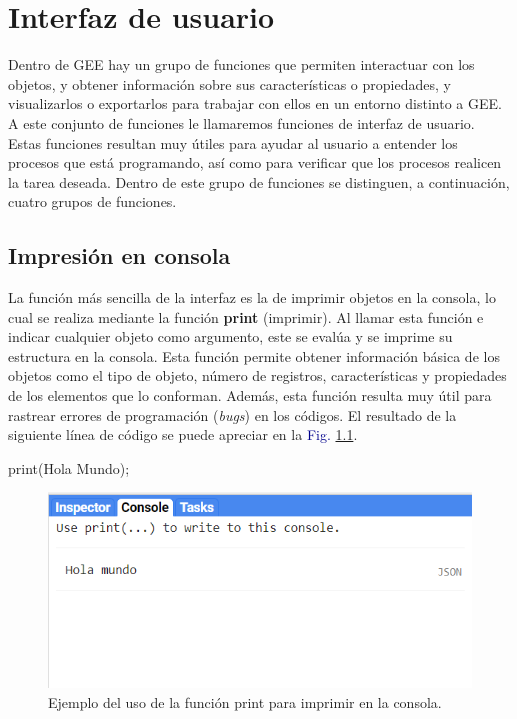 \documentclass[
  12pt,
  letterpaper,
  twoside]{book}
\newenvironment{Shaded}{\begin{snugshade}}{\end{snugshade}}
\newcommand{\FunctionTok}[1]{\textcolor[rgb]{0.48,0.12,0.64}{#1}}
\newcommand{\NormalTok}[1]{#1}
\newcommand{\OperatorTok}[1]{\textcolor[rgb]{0.00,0.00,0.00}{#1}}
\newcommand{\StringTok}[1]{\textcolor[rgb]{0.87,0.29,0.22}{#1}}
\newcommand\boldpurple[1]{\textcolor{darkpurple}{\textbf{#1}}}
\begin{document}
\newpage

\hypertarget{interfaz-de-usuario}{%
\chapter{Interfaz de usuario}\label{interfaz-de-usuario}}

Dentro de GEE hay un grupo de funciones que permiten interactuar con los objetos, y obtener información sobre sus características o propiedades, y visualizarlos o exportarlos para trabajar con ellos en un entorno distinto a GEE. A este conjunto de funciones le llamaremos funciones de interfaz de usuario. Estas funciones resultan muy útiles para ayudar al usuario a entender los procesos que está programando, así como para verificar que los procesos realicen la tarea deseada. Dentro de este grupo de funciones se distinguen, a continuación, cuatro grupos de funciones.

\hypertarget{impresiuxf3n-en-consola}{%
\section{Impresión en consola}\label{impresiuxf3n-en-consola}}

La función más sencilla de la interfaz es la de imprimir objetos en la consola, lo cual se realiza mediante la función \boldpurple{print} (imprimir). Al llamar esta función e indicar cualquier objeto como argumento, este se evalúa y se imprime su estructura en la consola. Esta función permite obtener información básica de los objetos como el tipo de objeto, número de registros, características y propiedades de los elementos que lo conforman. Además, esta función resulta muy útil para rastrear errores de programación (\emph{bugs}) en los códigos. El resultado de la siguiente línea de código se puede apreciar en la \textcolor{darkblue}{Fig.} \ref{fig:f31}.

\begin{Shaded}
\begin{Highlighting}[]
\FunctionTok{print}\NormalTok{(}\StringTok{\textquotesingle{}Hola Mundo\textquotesingle{}}\NormalTok{)}\OperatorTok{;}
\end{Highlighting}
\end{Shaded}

\begin{figure}[H]

{\centering \includegraphics[width=0.6\linewidth]{Img/holaMundo} 

}

\caption{Ejemplo del uso de la función print para imprimir en la consola.}\label{fig:f31}
\end{figure}
\end{document}
